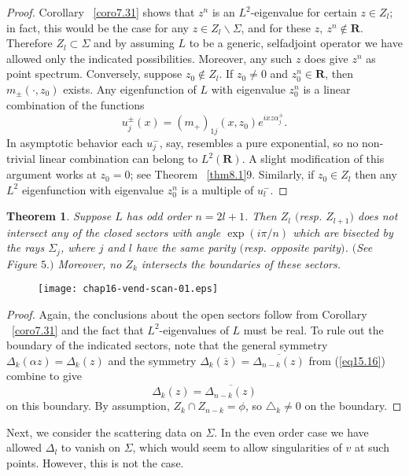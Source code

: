 \documentclass{surv-l}
\theoremstyle{plain}
\newtheorem{theorem}{Theorem}[section]
\theoremstyle{definition}
\numberwithin{equation}{chapter}
\begin{document}
\begin{proof}
Corollary ~\ref{coro7.31} shows that $z^{n}$ is an $L^{2}$-eigenvalue for certain $z\in Z_{l}$; in fact, this would be the case for any $z\in Z_{l}\backslash \Sigma$, and for these $z,\  z^{n}\not\in \mathbf{R}$. Therefore $ Z_{l}\subset\Sigma$ and by assuming $L$ to be a generic, selfadjoint operator we have allowed only the indicated possibilities. Moreover, any such $z$ does give $z^{n}$ as point spectrum. Conversely, suppose $z_{0}\not\in Z_{l}$. If $z_{0}\neq 0$ and $z_{0}^{n}\in \mathbf{R}$, then $m_{\pm}(\cdot, z_{0})$ exists. Any eigenfunction of $L$ with eigenvalue $z_{0}^{n}$ is a linear combination of the functions
\begin{equation}\label{eq16.7}
u_{j}^{\pm}(x)=(m_{+})_{1j}(x, z_{0})e^{ixz\alpha_{j}^{\pm}}.
\end{equation}
In asymptotic behavior each $u_{j}^{-}$, say, resembles a pure exponential, so no non-trivial linear combination can belong to $L^{2}(\mathbf{R})$. A slight modification of this argument works at $z_{0}=0$; see Theorem ~\ref{thm8.1}9. Similarly, if $z_{0}\in Z_{l}$ then any $L^{2}$ eigenfunction with eigenvalue $z_{0}^{n}$ is a multiple of $u_{l}^{-}$.
\end{proof}
\setcounter{theorem}{7}
\begin{theorem}\label{thm16.8}
Suppose $L$  has odd order $n=2l+1$.  Then $Z_{l}$ $($resp. $Z_{l+1})$ does not intersect any of the closed sectors with angle $\exp(i\pi/n)$ which are bisected by the rays $\Sigma_{j}$, where $j$ and $l$ have the same parity $($resp. opposite parity$)$. $($See Figure $5.)$  Moreover, no $Z_{k}$  intersects the boundaries of these sectors.
\end{theorem}

\begin{figure}
\texttt{[image: chap16-vend-scan-01.eps]}
\caption{}
\end{figure}

\begin{proof}
Again, the conclusions about the open sectors follow from Corollary ~\ref{coro7.31} and the fact that $L^{2}$-eigenvalues of $L$ must be real. To rule out the boundary of the indicated sectors, note that the general symmetry $\Delta_{k}(\alpha z)=\Delta_{k}(z)$ and the symmetry $\Delta_{k}(\overline{z})=\overline{\Delta_{n-k}(z)}$ from (\ref{eq15.16}) combine to give
\begin{equation*}
\Delta_{k}(z)=\overline{\Delta_{n-k}(z)}
\end{equation*}
on this boundary. By assumption, $Z_{k}\cap Z_{n-k}=\phi$, so $\triangle_{k}\neq 0$ on the boundary. \end{proof}
Next, we consider the scattering data on $\Sigma$. In the even order case we have allowed $\Delta_{l}$ to vanish on $\Sigma$, which would seem to allow singularities of $v$ at such points. However, this is not the case.
\end{document}
